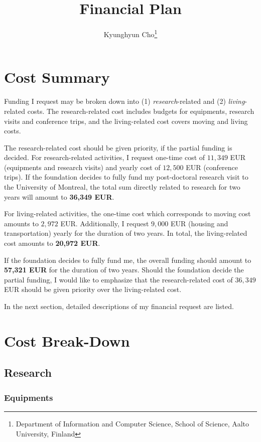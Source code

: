 \documentclass[11pt, oneside]{essay}
\title{Financial Plan}
\author{Kyunghyun Cho\thanks{Department of Information and
    Computer Science, School of Science, Aalto University,
             Finland}}
\begin{document}
\maketitle

\section{Cost Summary}

Funding I request may be broken down into (1)
\textit{research}-related and (2) \textit{living}-related
costs. The research-related cost includes budgets for equipments,
research visits and conference trips, and the living-related
cost covers moving and living costs.

The research-related cost should be given priority, if the
partial funding is decided. For research-related activities, I
request one-time cost of $11,349$ EUR (equipments and research
visits) and yearly cost of $12,500$ EUR (conference trips). If
the foundation decides to fully fund my post-doctoral research
visit to the University of Montreal, the total sum directly
related to research for two years will amount to \textbf{36,349
EUR}.

For living-related activities, the one-time cost which
corresponds to moving cost amounts to $2,972$ EUR. Additionally,
I request $9,000$ EUR (housing and transportation)
yearly for the duration of two years. In total, the
living-related cost amounts to \textbf{20,972 EUR}.

If the foundation decides to fully fund me, the overall funding
should amount to \textbf{57,321 EUR} for the duration of two
years. Should the foundation decide the partial funding, I would
like to emphasize that the research-related cost of $36,349$ EUR
should be given priority over the living-related cost.

In the next section, detailed descriptions of my financial
request are listed.


\section{Cost Break-Down}

\subsection{Research}

\subsubsection{Equipments}
\end{document}
